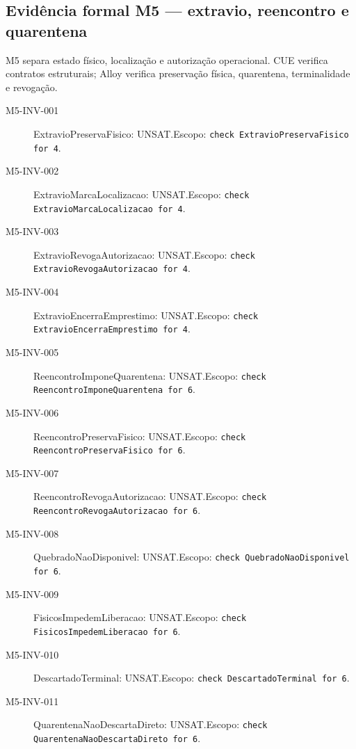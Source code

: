 \subsection*{Evidência formal M5 --- extravio, reencontro e quarentena}
M5 separa estado físico, localização e autorização operacional. CUE verifica contratos estruturais; Alloy verifica preservação física, quarentena, terminalidade e revogação.
\begin{description}
\item[M5-INV-001] ExtravioPreservaFisico: UNSAT.\newline Escopo: \texttt{check ExtravioPreservaFisico for 4}.
\item[M5-INV-002] ExtravioMarcaLocalizacao: UNSAT.\newline Escopo: \texttt{check ExtravioMarcaLocalizacao for 4}.
\item[M5-INV-003] ExtravioRevogaAutorizacao: UNSAT.\newline Escopo: \texttt{check ExtravioRevogaAutorizacao for 4}.
\item[M5-INV-004] ExtravioEncerraEmprestimo: UNSAT.\newline Escopo: \texttt{check ExtravioEncerraEmprestimo for 4}.
\item[M5-INV-005] ReencontroImponeQuarentena: UNSAT.\newline Escopo: \texttt{check ReencontroImponeQuarentena for 6}.
\item[M5-INV-006] ReencontroPreservaFisico: UNSAT.\newline Escopo: \texttt{check ReencontroPreservaFisico for 6}.
\item[M5-INV-007] ReencontroRevogaAutorizacao: UNSAT.\newline Escopo: \texttt{check ReencontroRevogaAutorizacao for 6}.
\item[M5-INV-008] QuebradoNaoDisponivel: UNSAT.\newline Escopo: \texttt{check QuebradoNaoDisponivel for 6}.
\item[M5-INV-009] FisicosImpedemLiberacao: UNSAT.\newline Escopo: \texttt{check FisicosImpedemLiberacao for 6}.
\item[M5-INV-010] DescartadoTerminal: UNSAT.\newline Escopo: \texttt{check DescartadoTerminal for 6}.
\item[M5-INV-011] QuarentenaNaoDescartaDireto: UNSAT.\newline Escopo: \texttt{check QuarentenaNaoDescartaDireto for 6}.

\end{description}
